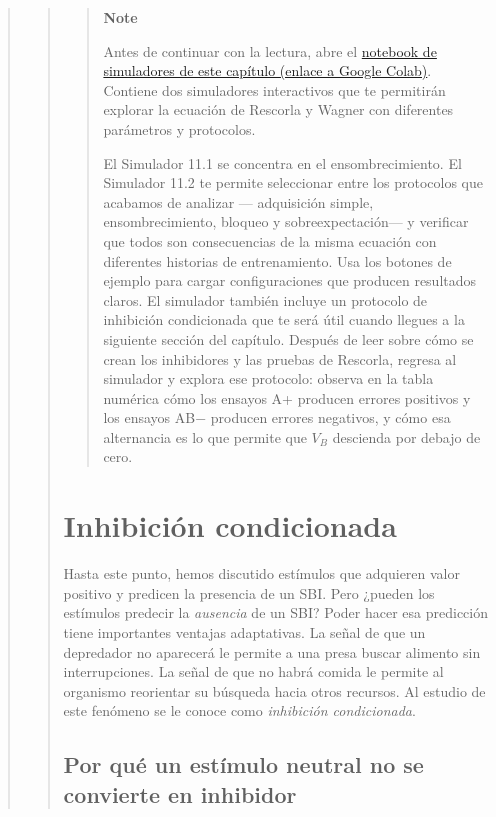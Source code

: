 \documentclass[
  letterpaper,
  DIV=11,
  numbers=noendperiod]{scrreprt}
\begin{document}
\begin{tcolorbox}[enhanced jigsaw, arc=.35mm, bottomrule=.15mm, breakable, colback=white, colframe=quarto-callout-note-color-frame, left=2mm, leftrule=.75mm, opacityback=0, rightrule=.15mm, toprule=.15mm]
\begin{quote}
\begin{quote}
\begin{quote}
\textbf{Note}

Antes de continuar con la lectura, abre el
\href{https://colab.research.google.com/github/arbouria/Libro-ACA-2026/blob/main/Simuladores/Rescorla_Wagner.ipynb}{notebook
de simuladores de este capítulo (enlace a Google Colab)}. Contiene dos
simuladores interactivos que te permitirán explorar la ecuación de
Rescorla y Wagner con diferentes parámetros y protocolos.

El Simulador 11.1 se concentra en el ensombrecimiento. El Simulador 11.2
te permite seleccionar entre los protocolos que acabamos de analizar ---
adquisición simple, ensombrecimiento, bloqueo y sobreexpectación--- y
verificar que todos son consecuencias de la misma ecuación con
diferentes historias de entrenamiento. Usa los botones de ejemplo para
cargar configuraciones que producen resultados claros. El simulador
también incluye un protocolo de inhibición condicionada que te será útil
cuando llegues a la siguiente sección del capítulo. Después de leer
sobre cómo se crean los inhibidores y las pruebas de Rescorla, regresa
al simulador y explora ese protocolo: observa en la tabla numérica cómo
los ensayos A+ producen errores positivos y los ensayos AB− producen
errores negativos, y cómo esa alternancia es lo que permite que
\(V_B\)\hspace{0pt} descienda por debajo de cero.
\end{quote}

\mbox{}%
\section{Inhibición condicionada}\label{inhibiciuxf3n-condicionada}

Hasta este punto, hemos discutido estímulos que adquieren valor positivo
y predicen la presencia de un SBI. Pero ¿pueden los estímulos predecir
la \emph{ausencia} de un SBI? Poder hacer esa predicción tiene
importantes ventajas adaptativas. La señal de que un depredador no
aparecerá le permite a una presa buscar alimento sin interrupciones. La
señal de que no habrá comida le permite al organismo reorientar su
búsqueda hacia otros recursos. Al estudio de este fenómeno se le conoce
como \emph{inhibición condicionada}.

\mbox{}%
\subsection{Por qué un estímulo neutral no se convierte en
inhibidor}\label{por-quuxe9-un-estuxedmulo-neutral-no-se-convierte-en-inhibidor}


\end{quote}
\end{quote}
\end{tcolorbox}
\end{document}
